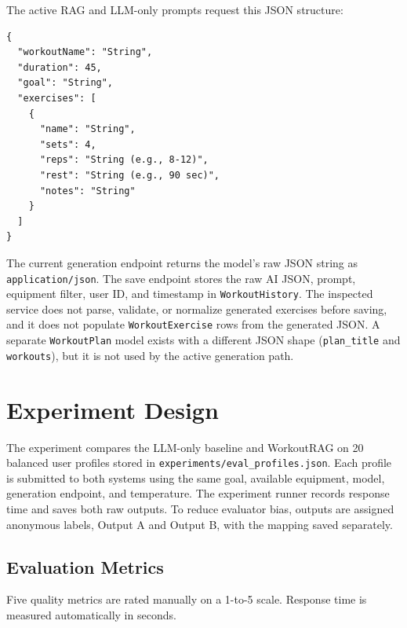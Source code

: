 \documentclass[12pt]{article}
\begin{document}
The active RAG and LLM-only prompts request this JSON structure:
\begin{verbatim}
{
  "workoutName": "String",
  "duration": 45,
  "goal": "String",
  "exercises": [
    {
      "name": "String",
      "sets": 4,
      "reps": "String (e.g., 8-12)",
      "rest": "String (e.g., 90 sec)",
      "notes": "String"
    }
  ]
}
\end{verbatim}

The current generation endpoint returns the model's raw JSON string as \texttt{application/json}. The save endpoint stores the raw AI JSON, prompt, equipment filter, user ID, and timestamp in \texttt{WorkoutHistory}. The inspected service does not parse, validate, or normalize generated exercises before saving, and it does not populate \texttt{WorkoutExercise} rows from the generated JSON. A separate \texttt{WorkoutPlan} model exists with a different JSON shape (\texttt{plan\_title} and \texttt{workouts}), but it is not used by the active generation path.

\section{Experiment Design}
The experiment compares the LLM-only baseline and WorkoutRAG on 20 balanced user profiles stored in \texttt{experiments/eval\_profiles.json}. Each profile is submitted to both systems using the same goal, available equipment, model, generation endpoint, and temperature. The experiment runner records response time and saves both raw outputs. To reduce evaluator bias, outputs are assigned anonymous labels, Output A and Output B, with the mapping saved separately.

\subsection{Evaluation Metrics}
Five quality metrics are rated manually on a 1-to-5 scale. Response time is measured automatically in seconds.
\end{document}
